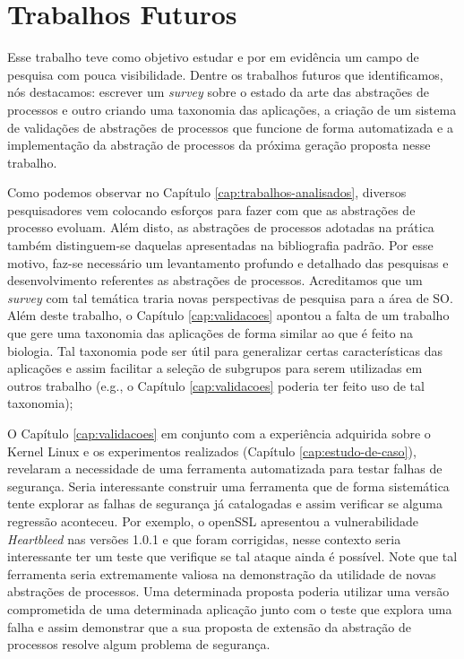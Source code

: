 \section{Trabalhos Futuros}


Esse trabalho teve como objetivo estudar e por em evidência um campo de
pesquisa com pouca visibilidade. Dentre os trabalhos futuros que identificamos,
nós destacamos: escrever um \textit{survey} sobre o estado da arte das
abstrações de processos e outro criando uma taxonomia das aplicações, a criação
de um sistema de validações de abstrações de processos que funcione de forma
automatizada e a implementação da abstração de processos da próxima geração
proposta nesse trabalho.

Como podemos observar no Capítulo \ref{cap:trabalhos-analisados}, diversos
pesquisadores vem colocando esforços para fazer com que as abstrações de
processo evoluam. Além disto, as abstrações de processos adotadas na prática
também distinguem-se daquelas apresentadas na bibliografia padrão. Por esse
motivo, faz-se necessário um levantamento profundo e detalhado das pesquisas e
desenvolvimento referentes as abstrações de processos. Acreditamos que um
\textit{survey} com tal temática traria novas perspectivas de pesquisa para a
área de SO. Além deste trabalho, o Capítulo \ref{cap:validacoes} apontou a
falta de um trabalho que gere uma taxonomia das aplicações de forma similar ao
que é feito na biologia.  Tal taxonomia pode ser útil para generalizar certas
características das aplicações e assim facilitar a seleção de subgrupos para
serem utilizadas em outros trabalho (e.g., o Capítulo \ref{cap:validacoes}
poderia ter feito uso de tal taxonomia);

O Capítulo \ref{cap:validacoes} em conjunto com a experiência adquirida sobre o
Kernel Linux e os experimentos realizados (Capítulo \ref{cap:estudo-de-caso}),
revelaram a necessidade de uma ferramenta automatizada para testar falhas de
segurança. Seria interessante construir uma ferramenta que de forma sistemática
tente explorar as falhas de segurança já catalogadas e assim verificar se
alguma regressão aconteceu. Por exemplo, o openSSL apresentou a vulnerabilidade
\textit{Heartbleed} nas versões 1.0.1 e que foram corrigidas, nesse contexto
seria interessante ter um teste que verifique se tal ataque ainda é possível.
Note que tal ferramenta seria extremamente valiosa na demonstração da utilidade
de novas abstrações de processos. Uma determinada proposta poderia utilizar uma
versão comprometida de uma determinada aplicação junto com o teste que explora
uma falha e assim demonstrar que a sua proposta de extensão da abstração de
processos resolve algum problema de segurança.

